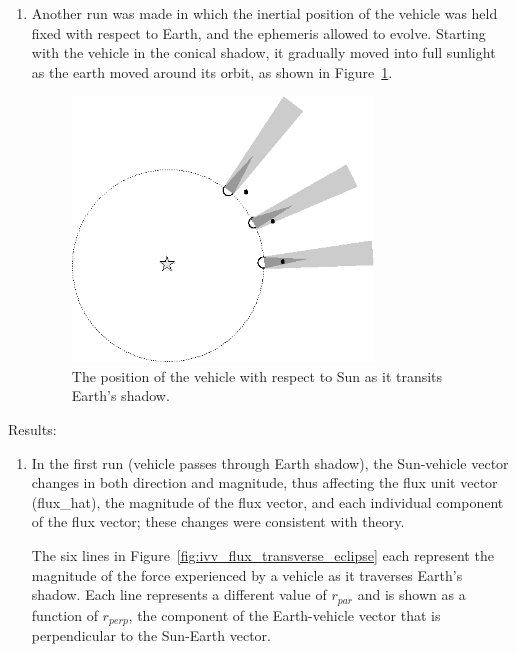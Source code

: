 \begin{description}
\begin{enumerate}
        \item{}
        Another run was made in which the inertial position of the
        vehicle was held fixed with respect to Earth, and the ephemeris allowed to evolve.
        Starting with the vehicle in the conical shadow, it gradually moved
        into full sunlight as the earth moved around its orbit, as shown in
        Figure~\ref{fig:ivv_transverse_eclipse_layout2}.


        \begin{figure}[!ht]
          \includegraphics[width=80mm]{figs/eclipse/drawings2_te.jpg}
          \caption{The position of the vehicle with respect to Sun as it transits
            Earth's shadow.}
          \label{fig:ivv_transverse_eclipse_layout2}
        \end{figure}
      \end{enumerate}

    \item{Results:}\newline
    \begin{enumerate}

      \item{}
      In the first run (vehicle passes through Earth shadow), the Sun-vehicle vector changes in both direction and
      magnitude, thus
      affecting the flux unit vector (flux\_hat), the magnitude of the flux
      vector, and each individual component of the flux vector; these changes
      were consistent with theory.

    The six lines in Figure~\ref{fig:ivv_flux_transverse_eclipse}
    each represent the magnitude of the force
    experienced by a vehicle as it traverses Earth's shadow.  Each line
    represents a different value of $r_{\mathit{par}}$ and is
    shown as a function of $r_{\mathit{perp}}$, the component of the
    Earth-vehicle vector that is perpendicular to the Sun-Earth vector.


\end{enumerate}
\end{description}
